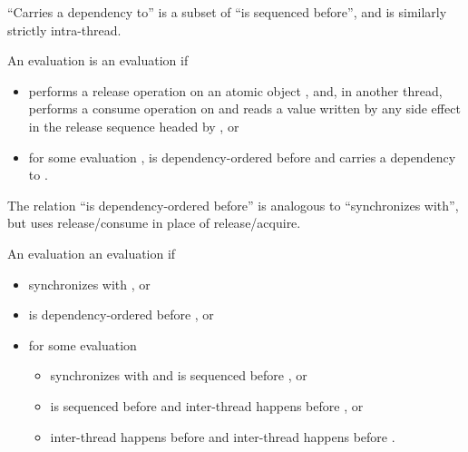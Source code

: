 \enternote ``Carries a dependency to'' is a subset of ``is sequenced before'',
and is similarly strictly intra-thread. \exitnote

\pnum
An evaluation  is  an evaluation
 if
\begin{itemize}

\item
{} performs a release operation on an atomic object , and, in
another thread,  performs a consume operation on  and reads a
value written by any
%
side effect in the release sequence headed by , or

\item
for some evaluation ,  is dependency-ordered before  and
 carries a dependency to .

\end{itemize}
\enternote The relation ``is dependency-ordered before'' is analogous to
``synchronizes with'', but uses release/consume in place of release/acquire.
\exitnote

\pnum
An evaluation   an evaluation 
if

\begin{itemize}

\item
{} synchronizes with , or

\item
{} is dependency-ordered before , or

\item
for some evaluation 

\begin{itemize}
\item
{} synchronizes with  and  is sequenced before ,
or

\item
{} is sequenced before  and  inter-thread happens before
, or

\item
{} inter-thread happens before  and  inter-thread happens
before .
\end{itemize}
\end{itemize}

